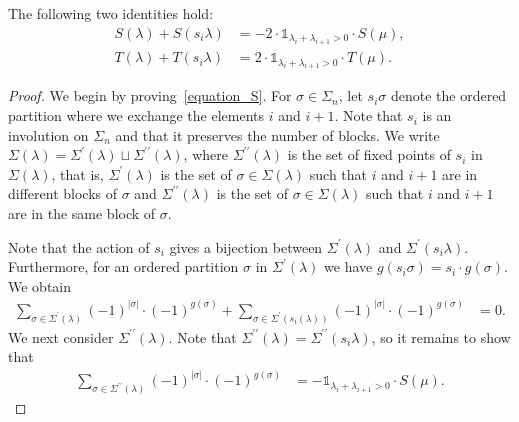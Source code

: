 \documentclass[ALCO,ThmDefs,Unicode,epreuves]{cedram}
\newcommand{\ungras}{\mathds{1}}
\begin{document}
\begin{prop}
The following two identities hold:
\begin{align}
S(\lambda) + S(s_{i}\lambda)
& =
-2 \cdot \ungras_{\lambda_{i}+\lambda_{i+1}>0}\cdot S(\mu) ,
\label{equation_S} \\
T(\lambda) + T(s_{i}\lambda)
& =
2 \cdot \ungras_{\lambda_{i}+\lambda_{i+1}>0}\cdot T(\mu) .
\label{equation_T}
\end{align}
\label{proposition_S_equal_T}
\end{prop}
\begin{proof}
We begin by proving~\eqref{equation_S}.
For $\sigma \in \Sigma_{n}$, let $s_{i}\sigma$ denote the
ordered partition where we exchange the elements $i$ and $i+1$.
Note that $s_{i}$ is an involution on $\Sigma_{n}$
and that it preserves the number of blocks.
We write
$\Sigma(\lambda) =\Sigma^{\prime}(\lambda) \sqcup \Sigma^{\prime\prime}(\lambda)$,
where $\Sigma^{\prime\prime}(\lambda)$ is the set of fixed points of $s_{i}$
in~$\Sigma(\lambda)$,
that is, 
$\Sigma^{\prime}(\lambda)$ is the set of $\sigma\in\Sigma(\lambda)$
such that $i$ and $i+1$ are in different blocks of $\sigma$
and
$\Sigma^{\prime\prime}(\lambda)$ is the set of $\sigma\in\Sigma(\lambda)$
such that $i$ and $i+1$ are in the same block of $\sigma$.



Note that the action of $s_{i}$ gives a bijection between
$\Sigma^{\prime}(\lambda)$ and $\Sigma^{\prime}(s_{i} \lambda)$.
Furthermore, for an ordered partition $\sigma$ in $\Sigma^{\prime}(\lambda)$
we have
$g(s_{i}\sigma) = s_{i}\cdot g(\sigma)$.
We obtain
\begin{align}
\sum_{\sigma \in \Sigma^{\prime}(\lambda)}
(-1)^{|\sigma|} \cdot (-1)^{g(\sigma)}
+
\sum_{\sigma \in \Sigma^{\prime}(s_{i}(\lambda))}
(-1)^{|\sigma|} \cdot (-1)^{g(\sigma)}
& = 0 
.
\label{equation_Sigma_prime}
\end{align}
We next consider $\Sigma^{\prime\prime}(\lambda)$.
Note that $\Sigma^{\prime\prime}(\lambda) =\Sigma^{\prime\prime}(s_{i}\lambda)$, so 
it remains to show that
\begin{align}
\sum_{\sigma\in\Sigma^{\prime\prime}(\lambda)}
(-1)^{|\sigma|} \cdot (-1)^{g(\sigma)}
& =
-\ungras_{\lambda_{i}+\lambda_{i+1}>0}\cdot S(\mu).
\label{equation_Sigma_prime_prime}
\end{align}



\end{proof}
\end{document}
